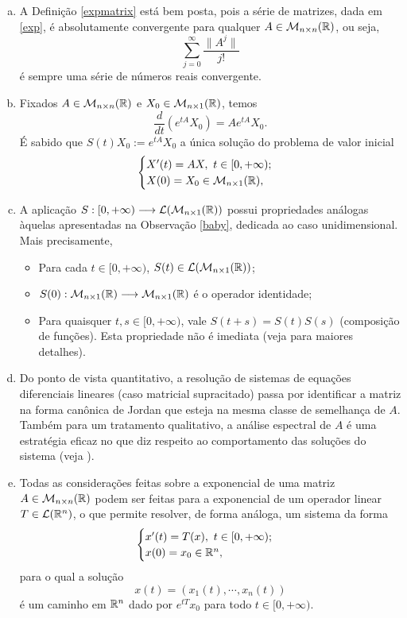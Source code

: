 \begin{remark}\label{property}
    \begin{enumerate}[(a)]
    \item A Definição \ref{expmatrix}  está bem posta, pois a série de matrizes, dada em \eqref{exp}, é absolutamente convergente para qualquer $A\in \mathcal M _{n\times n} (\mathbb{R})$, ou seja, 
    \[
    \displaystyle \sum_{j=0}^{\infty} \frac{\| A^j \|}{j!}
    \]
    é sempre uma série de números reais convergente.
    \item Fixados $A\in \mathcal M_{n\times n} (\mathbb{R})$ e $X_0 \in \mathcal M_{n\times 1} (\mathbb{R})$, temos
    \[
    \displaystyle \frac{d}{dt}(e^{tA}X_0) = Ae^{tA}X_0.
    \]
    É sabido que $S(t)X_0 := e^{tA} X_0$ a única solução do problema de valor inicial
    \[
\begin{cases}
    X'(t)=AX,\ t\in [0,+\infty);\\
    X(0)=X_0 \in \mathcal M_{n\times 1} (\mathbb{R} ),
\end{cases}
\]
    \item A aplicação $S:[0,+\infty) \longrightarrow \mathcal L (\mathcal M_{n\times 1} (\mathbb{R}))$ possui propriedades análogas àquelas apresentadas na Observação \ref{baby}, dedicada ao caso unidimensional. Mais precisamente,
    \begin{itemize}
    \item Para cada $t\in [0,+\infty)$, $S(t)\in \mathcal L (\mathcal M_{n\times 1} (\mathbb{R}))$;
    \item $S(0):\mathcal M_{n\times 1} (\mathbb{R}) \longrightarrow \mathcal M_{n\times 1} (\mathbb{R})$ é o operador identidade;
    \item Para quaisquer $t,s\in [0,+\infty)$, vale $S(t+s)=S(t)S(s)$ (composição de funções). Esta propriedade não é imediata (veja \cite{rirsch1974differential} para maiores detalhes). 
    \end{itemize}
    \item Do ponto de vista quantitativo, a resolução de sistemas de equações diferenciais lineares (caso matricial supracitado) passa por identificar a matriz na forma canônica de Jordan que esteja na mesma classe de semelhança de $A$. Também para um tratamento qualitativo, a análise espectral de $A$ é uma estratégia eficaz no que diz respeito ao comportamento das soluções do sistema (veja \cite{rirsch1974differential}). 
    \item Todas as considerações feitas sobre a exponencial de uma matriz $A\in \mathcal M_{n\times n} (\mathbb{R})$ podem ser feitas para a exponencial de um operador linear $T\in \mathcal L (\mathbb{R} ^n)$, o que permite resolver, de forma análoga, um sistema da forma 
\[
\begin{cases}
    x'(t)=T(x),\ t\in [0,+\infty);\\
    x(0)=x_0 \in \mathbb{R} ^n,
\end{cases}
\]
para o qual a solução 
\[
x(t)=(x_1 (t), \cdots , x_n (t))
\]
é um caminho em $\mathbb{R}^n$ dado por $e^{tT}x_0$ para todo $t\in [0,+\infty)$.

    \end{enumerate}
\end{remark}
